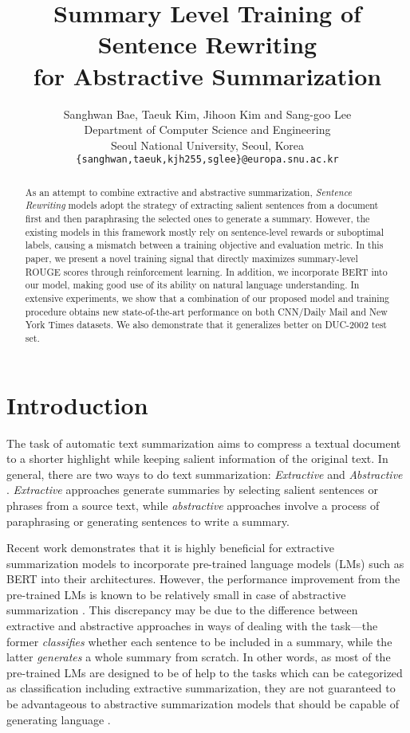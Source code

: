 \documentclass[11pt,a4paper]{article}
\title{Summary Level Training of Sentence Rewriting \\ for Abstractive Summarization}
\author{Sanghwan Bae, Taeuk Kim, Jihoon Kim {\normalfont and} Sang-goo Lee \\
  Department of Computer Science and Engineering \\
  Seoul National University, Seoul, Korea \\
  {\tt \{sanghwan,taeuk,kjh255,sglee\}@europa.snu.ac.kr} \\}
\date{}
\begin{document}
\maketitle
\begin{abstract}
  As an attempt to combine extractive and abstractive summarization, \emph{Sentence Rewriting} models adopt the strategy of extracting salient sentences from a document first and then paraphrasing the selected ones to generate a summary.
  However, the existing models in this framework mostly rely on sentence-level rewards or suboptimal labels, 
  causing a mismatch between a training objective and evaluation metric.
  In this paper, we present a novel training signal that directly maximizes summary-level ROUGE scores through reinforcement learning. In addition, we incorporate BERT into our model, making good use of its ability on natural language understanding. 
  In extensive experiments, we show that a combination of our proposed model and training procedure obtains new state-of-the-art performance on both CNN/Daily Mail and New York Times datasets.
  We also demonstrate that it generalizes better on DUC-2002 test set.
\end{abstract}

\section{Introduction}

The task of automatic text summarization aims to
compress a textual document to a shorter highlight
while keeping salient information of the original text.
In general, there are two ways to do text summarization:
\emph{Extractive} and \emph{Abstractive} \cite{mani2001automatic}.
\emph{Extractive} approaches generate summaries by
selecting salient sentences or phrases from 
a source text, while \emph{abstractive} approaches
involve a process of paraphrasing or generating sentences to write a summary.

Recent work \cite{liu2019fine, zhang-etal-2019-hibert} demonstrates that it is highly beneficial for extractive summarization models to incorporate pre-trained language models (LMs) such as BERT \cite{devlin-etal-2019-bert} into their architectures. 
However, the performance improvement from the pre-trained LMs is known to be relatively small in case of abstractive summarization \cite{zhang2019pretraining, hoang2019efficient}.
This discrepancy may be due to the difference between extractive and abstractive approaches in ways of dealing with the task---the former \textit{classifies} whether each sentence to be included in a summary, while the latter \textit{generates} a whole summary from scratch. 
In other words, as most of the pre-trained LMs are designed to be of help to the tasks which can be categorized as classification including extractive summarization, they are not guaranteed to be advantageous to abstractive summarization models that should be capable of generating language \cite{wang-cho-2019-bert, zhang2019bertscore}.
\end{document}
